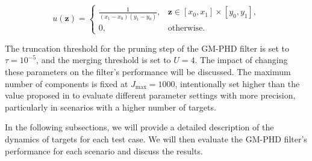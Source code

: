 \begin{equation}
    u(\mathbf{z}) = \begin{cases}
        \frac{1}{(x_1 - x_0)(y_1 - y_0)}, & \mathbf{z} \in [x_0, x_1] \times [y_0, y_1], \\
        0, & \text{otherwise}.
    \end{cases}
\end{equation}

The truncation threshold for the pruning step of the GM-PHD filter is set to $\tau = 10^{-5}$, and the merging threshold is set to $U = 4$. The impact of changing these parameters on the filter's performance will be discussed. The maximum number of components is fixed at $J_{\mathrm{max}} = 1000$, intentionally set higher than the value proposed in \cite{voGaussianMixtureProbability2006} to evaluate different parameter settings with more precision, particularly in scenarios with a higher number of targets.

In the following subsections, we will provide a detailed description of the dynamics of targets for each test case. We will then evaluate the GM-PHD filter's performance for each scenario and discuss the results.
